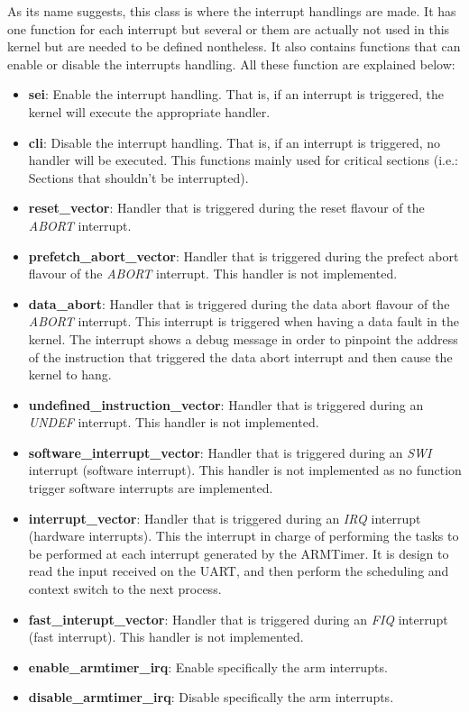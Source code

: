 As its name suggests, this class is where the interrupt handlings are made. It has one function for each interrupt but several or them are actually not used in this kernel but are needed to be defined nontheless. It also contains functions that can enable or disable the interrupts handling. All these function are explained below:

\begin{itemize}
	\item \textbf{sei}: Enable the interrupt handling. That is, if an interrupt is triggered, the kernel will execute the appropriate handler.
	\item \textbf{cli}: Disable the interrupt handling. That is, if an interrupt is triggered, no handler will be executed. This functions mainly used for critical sections (i.e.: Sections that shouldn't be interrupted).
	\item \textbf{reset\_vector}: Handler that is triggered during the reset flavour of the \textit{ABORT} interrupt.
	\item \textbf{prefetch\_abort\_vector}: Handler that is triggered during the prefect abort flavour of the \textit{ABORT} interrupt. This handler is not implemented.
	\item \textbf{data\_abort}: Handler that is triggered during the data abort flavour of the \textit{ABORT} interrupt. This interrupt is triggered when having a data fault in the kernel. The interrupt shows a debug message in order to pinpoint the address of the instruction that triggered the data abort interrupt and then cause the kernel to hang.
	\item \textbf{undefined\_instruction\_vector}: Handler that is triggered during an \textit{UNDEF} interrupt. This handler is not implemented.
	\item \textbf{software\_interrupt\_vector}: Handler that is triggered during an \textit{SWI} interrupt (software interrupt). This handler is not implemented as no function trigger software interrupts are implemented.
	\item \textbf{interrupt\_vector}: Handler that is triggered during an \textit{IRQ} interrupt (hardware interrupts). This the interrupt in charge of performing the tasks to be performed at each interrupt generated by the ARMTimer. It is design to read the input received on the UART, and then perform the scheduling and context switch to the next process.
	\item \textbf{fast\_interupt\_vector}: Handler that is triggered during an \textit{FIQ} interrupt (fast interrupt). This handler is not implemented.
	\item \textbf{enable\_armtimer\_irq}: Enable specifically the arm interrupts.
	\item \textbf{disable\_armtimer\_irq}: Disable specifically the arm interrupts.
\end{itemize}


